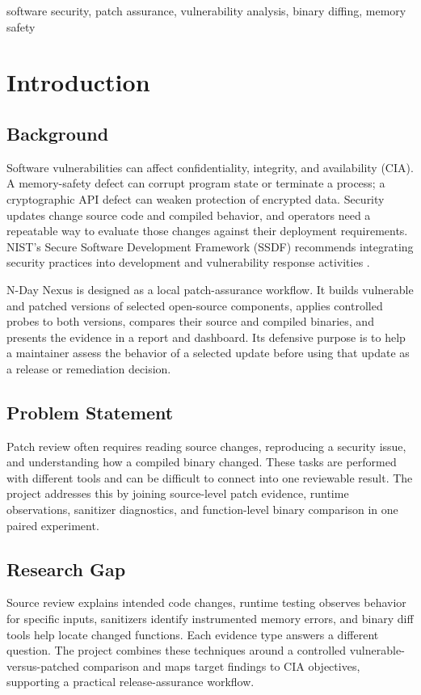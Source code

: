 \documentclass[conference]{IEEEtran}
\newcommand{\tool}{N-Day Nexus}
\begin{document}
\begin{IEEEkeywords}
software security, patch assurance, vulnerability analysis, binary diffing, memory safety
\end{IEEEkeywords}

\section{Introduction}
\subsection{Background}
Software vulnerabilities can affect confidentiality, integrity, and availability (CIA). A memory-safety defect can corrupt program state or terminate a process; a cryptographic API defect can weaken protection of encrypted data. Security updates change source code and compiled behavior, and operators need a repeatable way to evaluate those changes against their deployment requirements. NIST's Secure Software Development Framework (SSDF) recommends integrating security practices into development and vulnerability response activities \cite{nistssdf}.

\tool{} is designed as a local patch-assurance workflow. It builds vulnerable and patched versions of selected open-source components, applies controlled probes to both versions, compares their source and compiled binaries, and presents the evidence in a report and dashboard. Its defensive purpose is to help a maintainer assess the behavior of a selected update before using that update as a release or remediation decision.

\subsection{Problem Statement}
Patch review often requires reading source changes, reproducing a security issue, and understanding how a compiled binary changed. These tasks are performed with different tools and can be difficult to connect into one reviewable result. The project addresses this by joining source-level patch evidence, runtime observations, sanitizer diagnostics, and function-level binary comparison in one paired experiment.

\subsection{Research Gap}
Source review explains intended code changes, runtime testing observes behavior for specific inputs, sanitizers identify instrumented memory errors, and binary diff tools help locate changed functions. Each evidence type answers a different question. The project combines these techniques around a controlled vulnerable-versus-patched comparison and maps target findings to CIA objectives, supporting a practical release-assurance workflow.
\end{document}
